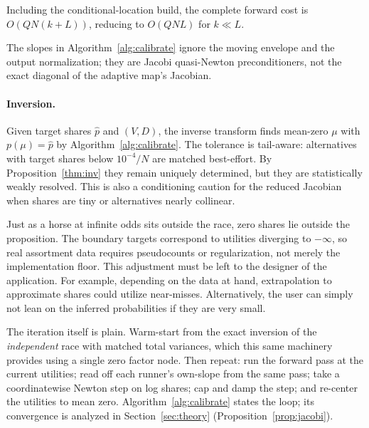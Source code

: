 \documentclass[12pt]{article}
\theoremstyle{remark}
\begin{document}
Including the conditional-location build, the complete forward cost
is $O(QN(k+L))$, reducing to $O(QNL)$ for $k \ll L$.

The slopes in
Algorithm~\ref{alg:calibrate} ignore the moving envelope and the output
normalization; they are Jacobi quasi-Newton preconditioners, not the exact
diagonal of the adaptive map's Jacobian.

\paragraph{Inversion.} Given target shares $\hat p$ and $(V, D)$, the
inverse transform finds mean-zero $\mu$ with $p(\mu) = \hat p$ by
Algorithm~\ref{alg:calibrate}. The tolerance is tail-aware: alternatives with target shares below
$10^{-4}/N$ are matched best-effort. By Proposition~\ref{thm:inv} they
remain uniquely determined, but they are statistically weakly resolved.
This is also a conditioning caution for the reduced Jacobian when shares
are tiny or alternatives nearly collinear.

Just as a horse at infinite odds sits outside the race, zero shares lie outside the proposition. The boundary targets
correspond to utilities diverging to $-\infty$, so real assortment data
requires pseudocounts or regularization, not merely the implementation
floor. This adjustment must be left to the designer of the application. For example, depending
on the data at hand, extrapolation to approximate shares could utilize near-misses. Alternatively, the user can
simply not lean on the inferred probabilities if they are very small. 

The iteration itself is plain. Warm-start from the exact inversion of
the \emph{independent} race with matched total variances, which this
same machinery provides using a single zero factor node. Then repeat: run
the forward pass at the current utilities; read off each runner's
own-slope from the same pass; take a coordinatewise Newton step on log
shares; cap and damp the step; and re-center the utilities to mean zero.
Algorithm~\ref{alg:calibrate} states the loop; its convergence is
analyzed in Section~\ref{sec:theory} (Proposition~\ref{prop:jacobi}).
\end{document}
